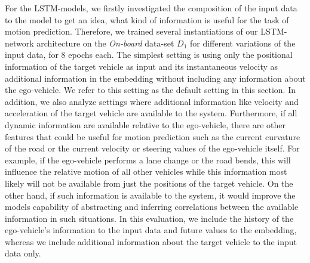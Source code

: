 For the \ac{LSTM}-models, we firstly investigated the composition of the input data to the model to get an idea, what kind of information is useful for the task of motion prediction.
Therefore, we trained several instantiations of our \ac{LSTM}-network architecture on the \emph{On-board} data-set $D_1$ for different variations of the input data, for \num{8} epochs each.
The simplest setting is using only the positional information of the target vehicle as input and its instantaneous velocity as additional information in the embedding without including any information about the ego-vehicle.
We refer to this setting as the default setting in this section.
In addition, we also analyze settings where additional information like velocity and acceleration of the target vehicle are available to the system.
Furthermore, if all dynamic information are available relative to the ego-vehicle, there are other features that could be useful for motion prediction such as the current curvature of the road or the current velocity or steering values of the ego-vehicle itself.
For example, if the ego-vehicle performs a lane change or the road bends, this will influence the relative motion of all other vehicles while this information most likely will not be available from just the positions of the target vehicle. 
On the other hand, if such information is available to the system, it would improve the models capability of abstracting and inferring correlations between the available information in such situations.
In this evaluation, we include the history of the ego-vehicle's information to the input data and future values to the embedding, whereas we include additional information about the target vehicle to the input data only. 

